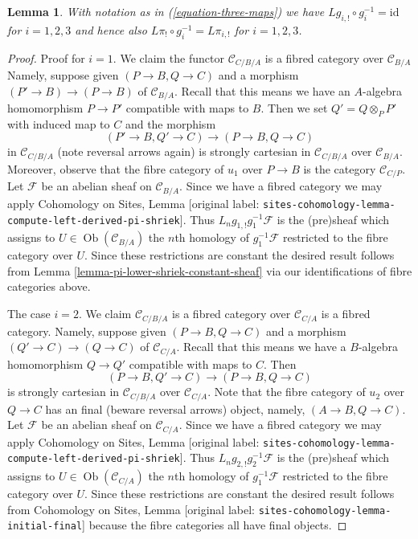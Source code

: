 \documentclass[10pt,a4paper]{article}
\theoremstyle{plain}
\newtheorem{lemma}[subsection]{Lemma}
\theoremstyle{definition}
\theoremstyle{remark}
\numberwithin{equation}{subsection}
\def\Ob{\mathop{\mathrm{Ob}}\nolimits}
\begin{document}
\begin{lemma}
\label{lemma-triangle-compute-lower-shriek}
With notation as in (\ref{equation-three-maps}) we have
$Lg_{i, !} \circ g_i^{-1} = \text{id}$ for $i = 1, 2, 3$
and hence also $L\pi_! \circ g_i^{-1} = L\pi_{i, !}$ for
$i = 1, 2, 3$.
\end{lemma}

\begin{proof}
Proof for $i = 1$. We claim the functor $\mathcal{C}_{C/B/A}$
is a fibred category over $\mathcal{C}_{B/A}$
Namely, suppose given $(P \to B, Q \to C)$
and a morphism $(P' \to B) \to (P \to B)$ of $\mathcal{C}_{B/A}$.
Recall that this means we have an $A$-algebra homomorphism
$P \to P'$ compatible with maps to $B$. Then we set $Q' = Q \otimes_P P'$
with induced map to $C$ and the morphism
$$
(P' \to B, Q' \to C) \longrightarrow (P \to B, Q \to C)
$$
in $\mathcal{C}_{C/B/A}$ (note reversal arrows again) is strongly cartesian
in $\mathcal{C}_{C/B/A}$ over $\mathcal{C}_{B/A}$. Moreover, observe
that the fibre category of $u_1$ over $P \to B$ is the category
$\mathcal{C}_{C/P}$. Let $\mathcal{F}$ be an abelian sheaf on
$\mathcal{C}_{B/A}$. Since we have a fibred category we may apply
Cohomology on Sites, Lemma
\textnormal{[original label: \nolinkurl{sites-cohomology-lemma-compute-left-derived-pi-shriek}]}.
Thus $L_ng_{1, !}g_1^{-1}\mathcal{F}$ is the (pre)sheaf
which assigns to $U \in \Ob(\mathcal{C}_{B/A})$ the $n$th homology of
$g_1^{-1}\mathcal{F}$ restricted to the fibre category over $U$.
Since these restrictions are constant the desired result follows from
Lemma \ref{lemma-pi-lower-shriek-constant-sheaf}
via our identifications of fibre categories above.

\medskip\noindent
The case $i = 2$.
We claim $\mathcal{C}_{C/B/A}$ is a fibred category over $\mathcal{C}_{C/A}$
is a fibred category. Namely, suppose given $(P \to B, Q \to C)$
and a morphism $(Q' \to C) \to (Q \to C)$ of $\mathcal{C}_{C/A}$.
Recall that this means we have a $B$-algebra homomorphism
$Q \to Q'$ compatible with maps to $C$. Then
$$
(P \to B, Q' \to C) \longrightarrow (P \to B, Q \to C)
$$
is strongly cartesian in $\mathcal{C}_{C/B/A}$ over $\mathcal{C}_{C/A}$.
Note that the fibre category of $u_2$ over $Q \to C$ has an final
(beware reversal arrows) object, namely, $(A \to B, Q \to C)$. Let
$\mathcal{F}$ be an abelian sheaf on $\mathcal{C}_{C/A}$.
Since we have a fibred category we may apply
Cohomology on Sites, Lemma
\textnormal{[original label: \nolinkurl{sites-cohomology-lemma-compute-left-derived-pi-shriek}]}.
Thus $L_ng_{2, !}g_2^{-1}\mathcal{F}$ is the (pre)sheaf
which assigns to $U \in \Ob(\mathcal{C}_{C/A})$ the $n$th homology of
$g_1^{-1}\mathcal{F}$ restricted to the fibre category over $U$.
Since these restrictions are constant the desired result follows from
Cohomology on Sites, Lemma \textnormal{[original label: \nolinkurl{sites-cohomology-lemma-initial-final}]}
because the fibre categories all have final objects.


\end{proof}
\end{document}
